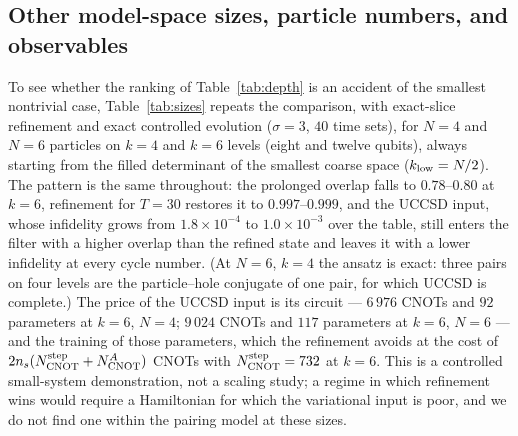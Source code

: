 \documentclass[
  aps,            %
  prc,            %
  reprint,        %
  superscriptaddress,
  floatfix,
  nofootinbib
]{revtex4-2}
\begin{document}
\subsection{Other model-space sizes, particle numbers, and observables}
\label{sec:sizes}
To see whether the ranking of Table~\ref{tab:depth} is an accident of the
smallest nontrivial case, Table~\ref{tab:sizes} repeats the comparison, with
exact-slice refinement and exact controlled evolution ($\sigma=3$, $40$ time
sets), for $N=4$ and $N=6$ particles on $k=4$ and $k=6$ levels (eight and
twelve qubits), always starting from the filled determinant of the smallest
coarse space ($k_{\rm low}=N/2$).  The pattern is the same throughout: the
prolonged overlap falls to $0.78$--$0.80$ at $k=6$, refinement for $T=30$
restores it to $0.997$--$0.999$, and the UCCSD input, whose infidelity grows
from $1.8\times10^{-4}$ to $1.0\times10^{-3}$ over the table, still enters the
filter with a higher overlap than the refined state and leaves it with a lower
infidelity at every cycle number.  (At $N=6$, $k=4$ the ansatz is exact: three
pairs on four levels are the particle--hole conjugate of one pair, for which
UCCSD is complete.)  The price of the UCCSD input is its circuit ---
$6\,976$ CNOTs and $92$ parameters at $k=6$, $N=4$; $9\,024$ CNOTs and $117$
parameters at $k=6$, $N=6$ --- and the training of those parameters, which the
refinement avoids at the cost of $2n_s(N_{\rm CNOT}^{\rm step}+N_{\rm CNOT}^{A})$
CNOTs with $N_{\rm CNOT}^{\rm step}=732$ at $k=6$.  This is a controlled
small-system demonstration, not a scaling study; a regime in which refinement
wins would require a Hamiltonian for which the variational input is poor, and
we do not find one within the pairing model at these sizes.
\end{document}

